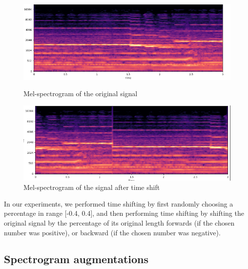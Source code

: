 \begin{figure}[H]
        \begin{minipage}{0.49\textwidth}
            \centering
            \includegraphics[width=\linewidth]{images/time-shift-original-spectogram.png}
            \caption*{Mel-spectrogram of the original signal}
        \end{minipage}%
        \hfill%
        \begin{minipage}{0.49\textwidth}
            \centering
            \includegraphics[width=\linewidth]{images/time-shift-augmented-spectogram.png}
            \caption*{Mel-spectrogram of the signal after time shift}
        \end{minipage}
                
        
        \label{fig:time-shift}
        
    \end{figure}

In our experiments, we performed time shifting by first randomly choosing a percentage in range [-0.4, 0.4], and then performing time shifting by shifting the original signal by the percentage of its original length forwards (if the chosen number was positive), or backward (if the chosen number was negative).

\subsection{Spectrogram augmentations}

